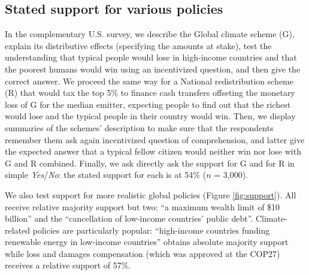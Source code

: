 \documentclass{nature}
\makeatletter
\renewenvironment*{figure}{\@float{figure}}{\end@float}
\makeatother
\begin{document}
\subsection{Stated support for various policies}

In the complementary U.S. survey, we describe the Global climate scheme (G), explain its distributive effects (specifying the amounts at stake), test the understanding that typical people would lose in high-income countries and that the poorest humans would win using an incentivized question, and then give the correct answer. We proceed the same way for a National redistribution scheme (R) that would tax the top 5\% to finance cash transfers offseting the monetary loss of G for the median emitter, expecting people to find out that the richest would lose and the typical people in their country would win. Then, we display summaries of the schemes' description to make sure that the respondents remember them ask again incentivized question of comprehension, and latter give the expected answer that a typical fellow citizen would neither win nor lose with G and R combined. Finally, we ask directly ask the support for G and for R in simple \textit{Yes}/\textit{No}: the stated support for each is at 54\% ($n$ = 3,000).

We also test support for more realistic %
global policies (Figure \ref{fig:support}). All receive relative majority support but two: ``a maximum wealth limit of \$10 billion'' and the ``cancellation of low-income countries' public debt''. Climate-related policies are particularly popular: ``high-income countries funding renewable energy in low-income countries'' obtains absolute majority support while loss and damages compensation (which was approved at the COP27) receives a relative support of  57\%. 

\begin{figure}
  \caption{Support for various global policies in the U.S. ($n$ = 3,000).}
  \label{fig:support}
\end{figure}
\end{document}
